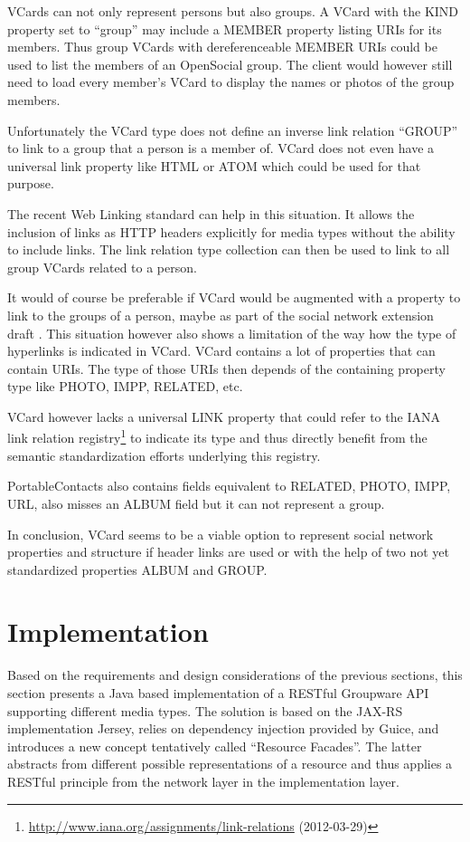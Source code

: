 \documentclass[11pt,a4paper,headsepline,twoside]{scrartcl}		%
\newcommand{\citeurl}[2]{\url{#1} (#2)}
\begin{document}
VCards can not only represent persons but also groups. A VCard with the KIND
property set to ``group'' may include a MEMBER property listing URIs for its
members. Thus group VCards with dereferenceable MEMBER URIs could be used to
list the members of an OpenSocial group. The client would however still need to
load every member's VCard to display the names or photos of the group members.

Unfortunately the VCard type does not define an inverse link relation ``GROUP''
to link to a group that a person is a member of. VCard does not even have a
universal link property like HTML or ATOM which could be used for that purpose.

The recent Web Linking standard \cite{RFC5988} can help in this situation. It
allows the inclusion of links as HTTP headers explicitly for media types without
the ability to include links. The link relation type
collection \cite{Amundsen2012} can then be used to link to all group VCards
related to a person.

It would of course be preferable if VCard would be augmented with a property to
link to the groups of a person, maybe as part of the social network extension
draft \cite{George2011}. This situation however also shows a limitation of the
way how the type of hyperlinks is indicated in VCard. VCard contains a lot of
properties that can contain URIs. The type of those URIs then depends of the
containing property type like PHOTO, IMPP, RELATED, etc.

VCard however lacks a universal LINK property that could refer to the IANA link
relation
registry\footnote{\citeurl{http://www.iana.org/assignments/link-relations}{2012-03-29}}
to indicate its type and thus directly benefit from the semantic standardization
efforts underlying this registry.

PortableContacts also contains fields equivalent to RELATED, PHOTO, IMPP, URL,
also misses an ALBUM field but it can not represent a group.

In conclusion, VCard seems to be a viable option to represent social network
properties and structure if header links are used or with the help of two not
yet standardized properties ALBUM and GROUP.

\section{Implementation}
\label{sec:implementation}

Based on the requirements and design considerations of the previous sections,
this section presents a Java based implementation of a RESTful Groupware API
supporting different media types. The solution is based on the
JAX-RS \cite{JAX-RS1.1} implementation Jersey, relies on dependency injection
provided by Guice, and introduces a new concept tentatively called ``Resource
Facades''. The latter abstracts from different possible representations of a
resource and thus applies a RESTful principle from the network layer in the
implementation layer.
\end{document}
